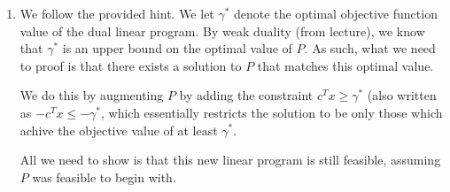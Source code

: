 \documentclass[12pt]{exam}
\newtheorem{lemma}[theorem]{Lemma}
\begin{document}
\begin{questions}
\begin{solution}
\begin{enumerate}[label=(\alph*)]
      \begin{lemma}
        If (ii) holds, then (iii) cannot hold.
      \end{lemma}
      \begin{proof}
        For the sake of contradiction, suppose (ii) is true and so is (iii). Then note the following:
        \begin{align*}
          \textbf{y}^T\textbf{A} &\geq 0 \tag{ By (ii) for some $\textbf{y}$ } \\
          \implies \textbf{y}^T\textbf{A}\textbf{x} &\geq 0 \tag{ Mulitply through by $\textbf{x}$ implied by (iii)}
        \end{align*}
        However, we also have:
        \begin{align*}
          \textbf{y}^T \textbf{A} \textbf{x} &\leq \textbf{y}^Tb \tag{Implied by (iii)} \\
          &< 0 \tag{Implied by (ii)}
        \end{align*}
        However, this is a contradiction. As such, it must be the case that if (ii) holds, then (iii) does not hold.
      \end{proof}
      \begin{lemma}
        If (ii) holds, then so does (iv).
      \end{lemma}
      \begin{proof}
        This is immediate by inspection.
      \end{proof}
      Putting the above results together, we have now deduced the second version of Farka's Lemma.

    \item
      We follow the provided hint. We let $\gamma^*$ denote the optimal objective function value of the dual linear program. By weak duality (from lecture), we know that $\gamma^*$ is an upper bound on the optimal value of $P$. As such, what we need to proof is that there exists a solution to $P$ that matches this optimal value.

      We do this by augmenting $P$ by adding the constraint $c^Tx \geq \gamma^*$ (also written as $-c^Tx \leq -\gamma^*$, which essentially restricts the solution to be only those which achive the objective value of at least $\gamma^*$.

      All we need to show is that this new linear program is still feasible, assuming $P$ was feasible to begin with.


\end{enumerate}
\end{solution}
\end{questions}
\end{document}
